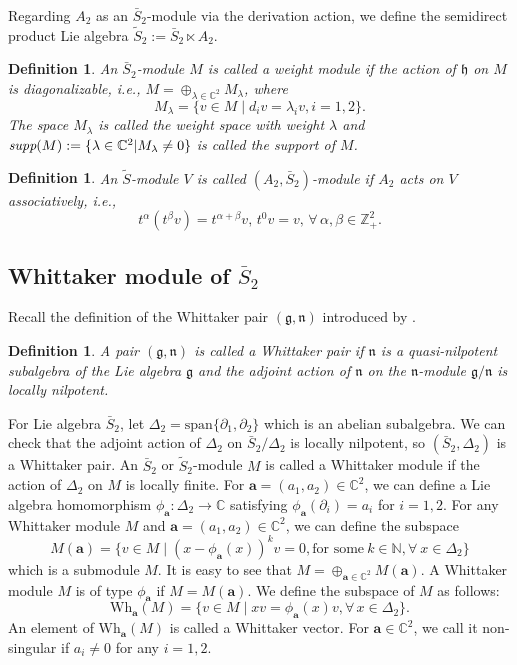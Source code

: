 \documentclass[12pt,a4paper]{amsart}
\newtheorem{Definition}[Theorem]{Definition}
\def\C{\mathbb{C}}
\def\mg{\mathfrak{g}}
\def\mn{\mathfrak{n}}
\def\ba{\mathbf{a}}
\begin{document}
Regarding $A_2$ as an $\bar{S}_2$-module via the derivation action, we define the semidirect product Lie algebra $\widetilde{S}_2:= \bar{S}_2 \ltimes A_2$.

\begin{Definition}
An $\bar{S}_2$-module $M$ is called a weight module if the action of $\mathfrak{h}$ on $M$ is diagonalizable, i.e., $M=\oplus_{\lambda \in \C^{2} }M_{\lambda}$, where
$$M_{\lambda}=\{v \in M \mid d_iv=\lambda_i v, i=1,2\}.$$
The space $M_{\lambda}$ is called the weight space with weight $\lambda$ and $\emph{supp}(M):= \{\lambda \in \C^2|M_{\lambda}\neq 0\}$ is called
the support of $M$.
\end{Definition}

\begin{Definition}\label{AS}
An $\widetilde{S}$-module $V$ is called $(A_2, \bar{S}_2)$-module if $A_2$ acts on $V$ associatively, i.e.,
$$t^{\alpha}(t^{\beta}v)=t^{\alpha+\beta}v, \, t^{0}v=v, \, \forall \, \alpha, \beta \in \mathbb{Z}^{2}_{+}.$$

\end{Definition}


\subsection{Whittaker module of $\bar{S}_2$}
Recall the definition of the Whittaker pair $(\mg,\mn)$ introduced by \cite{PV}.

\begin{Definition}
A pair $(\mg, \mn)$ is called a Whittaker pair if $\mn$ is a quasi-nilpotent subalgebra of the Lie algebra $\mg$ and
the adjoint action of $\mn$ on the $\mn$-module $\mg/\mn$ is locally nilpotent.
\end{Definition}

For Lie algebra $\bar{S}_2$, let $\Delta_2=\text{span}\{\partial_1, \partial_2\}$ which is an abelian subalgebra. We can check that the adjoint action of $\Delta_2$ on $\bar{S}_2 / \Delta_2$ is locally nilpotent, so $(\bar{S}_2,\Delta_2)$ is a Whittaker pair. An $\bar{S}_2$ or $\widetilde{S}_2$-module $M$ is called a Whittaker module if the action of $\Delta_2$ on $M$ is locally finite. For $\ba=(a_1,a_2) \in \mathbb{C}^2$, we can define a Lie algebra homomorphism $\phi_\ba:\Delta_2 \rightarrow \mathbb{C}$ satisfying $\phi_\ba(\partial_i)=a_i$ for $i=1,2$. For any Whittaker module $M$ and $\ba=(a_1,a_2) \in \mathbb{C}^2$, we can define the subspace
$$M(\ba)=\{v\in M\mid (x-\phi_\ba(x))^{k}v=0, \text{for some}\  k\in \mathbb{N}, \forall\  x\in \Delta_2\}$$
which is a submodule $M$. It is easy to see that $M=\oplus_{\ba\in \C^2} M(\ba)$.
A Whittaker module $M$ is of type $\phi_\ba$ if $M=M(\ba)$. We define the subspace of $M$ as follows:
$$\text{Wh}_\ba(M)=\{v\in M \mid xv=\phi_{\ba}(x)v, \forall \, x\in \Delta_2\}.$$
An element of $\text{Wh}_\ba(M)$ is called a Whittaker vector. For $\ba\in \mathbb{C}^{2}$, we call it non-singular if $a_i \neq 0$ for any $i=1,2$.
\end{document}
